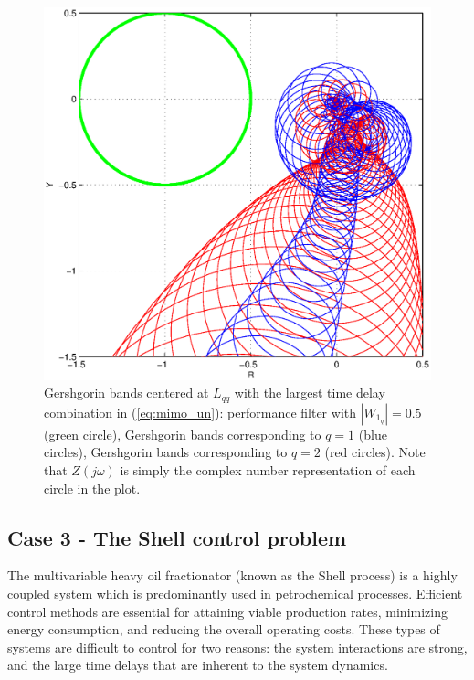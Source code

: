 \documentclass[A4, 10pt, conference]{ieeeconf}
\begin{document}
\begin{figure}
\centering
{}
\hspace*{-0.3cm}\includegraphics[scale=0.5]{pics/gersh.eps}
\caption{Gershgorin bands centered at $L_{qq}$ with the largest time delay combination in (\ref{eq:mimo_un}): performance filter with $|W_{1_{q}}|=0.5$ (green circle), Gershgorin bands corresponding to $q=1$ (blue circles), Gershgorin bands corresponding to $q=2$ (red circles). Note that $Z(j\omega)$ is simply the complex number representation of each circle in the plot.}
\label{fig:mimo2}
\end{figure}
 

\subsection{Case 3 - The Shell control problem} \label{ex:3}
The multivariable heavy oil fractionator (known as the Shell process) is a highly coupled system which is predominantly used in petrochemical processes. Efficient control methods are essential for attaining viable production rates, minimizing energy consumption, and reducing the overall operating costs. These types of systems are difficult to control for two reasons: the system interactions are strong, and the large time delays that are inherent to the system dynamics. 
\end{document}
